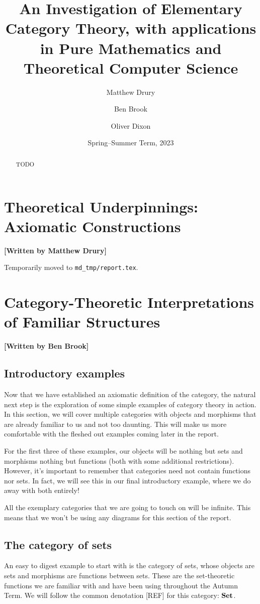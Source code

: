 \documentclass[10pt,a4paper,reqno]{amsart}
\title[An Investigation of Elementary Category Theory]{An Investigation of %
        Elementary Category Theory, with applications in Pure Mathematics and %
        Theoretical Computer Science}
\author{Matthew Drury} \email{\yorkemail{md1499}}
\author{Ben Brook}     \email{\yorkemail{bb1170}}
\author{Oliver Dixon}  \email{\yorkemail{od641}}
\date{Spring--Summer Term, 2023}
\numberwithin{figure}{section}
\begin{document}
\begin{abstract}
        TODO
\end{abstract}
\maketitle
\tableofcontents
\section{Theoretical %
        Underpinnings: Axiomatic Constructions}
\begin{flushright}
        \textbf{[Written by Matthew Drury]}
\end{flushright}

\noindent Temporarily moved to \texttt{md\_tmp/report.tex}.

\section{Category-Theoretic %
        Interpretations of Familiar Structures}
\begin{flushright}
        \textbf{[Written by Ben Brook]} 
\end{flushright}

\subsection{Introductory examples}
Now that we have established an axiomatic definition of the category, the
natural next step is the exploration of some simple examples of category theory
in action. In this section, we will cover multiple categories with objects and
morphisms that are already familiar to us and not too daunting. This will make
us more comfortable with the fleshed out examples coming later in the report.

For the first three of these examples, our objects will be
nothing but sets and morphisms nothing but functions (both with some additional
restrictions). However, it's important to remember that categories need not
contain functions nor sets. In fact, we will see this in our final introductory
example, where we do away with both entirely!

All the exemplary categories that we are going to touch on will be infinite.
This means that we won't be using any diagrams for this section of the report.

\subsection{The category of sets}
An easy to digest example to start with is the category of sets, whose objects are sets and
morphisms are functions between sets. These are the set-theoretic functions we
are familiar with and have been using throughout the Autumn Term. We will follow
the common denotation [REF] for this category: $\operatorname{\mathbf{Set}}$.
\end{document}
